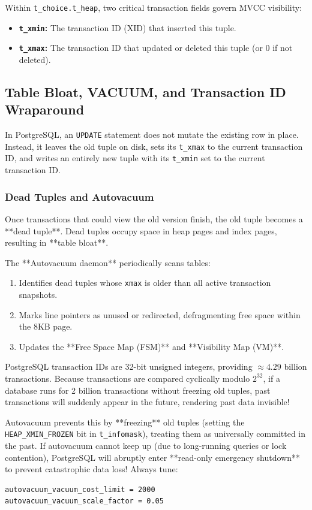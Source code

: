 Within \texttt{t\_choice.t\_heap}, two critical transaction fields govern MVCC visibility:
\begin{itemize}[leftmargin=15pt]
  \item \textbf{\texttt{t\_xmin}:} The transaction ID (XID) that inserted this tuple.
  \item \textbf{\texttt{t\_xmax}:} The transaction ID that updated or deleted this tuple (or 0 if not deleted).
\end{itemize}

\subsection{Table Bloat, VACUUM, and Transaction ID Wraparound}

In PostgreSQL, an \texttt{UPDATE} statement does not mutate the existing row in place. Instead, it leaves the old tuple on disk, sets its \texttt{t\_xmax} to the current transaction ID, and writes an entirely new tuple with its \texttt{t\_xmin} set to the current transaction ID.

\subsubsection{Dead Tuples and Autovacuum}
Once transactions that could view the old version finish, the old tuple becomes a **dead tuple**. Dead tuples occupy space in heap pages and index pages, resulting in **table bloat**.

The **Autovacuum daemon** periodically scans tables:
\begin{enumerate}[leftmargin=15pt]
  \item Identifies dead tuples whose \texttt{xmax} is older than all active transaction snapshots.
  \item Marks line pointers as unused or redirected, defragmenting free space within the 8KB page.
  \item Updates the **Free Space Map (FSM)** and **Visibility Map (VM)**.
\end{enumerate}

\begin{productionwarningbox}
PostgreSQL transaction IDs are 32-bit unsigned integers, providing $\approx 4.29$ billion transactions. Because transactions are compared cyclically modulo $2^{32}$, if a database runs for 2 billion transactions without freezing old tuples, past transactions will suddenly appear in the future, rendering past data invisible!

Autovacuum prevents this by **freezing** old tuples (setting the \texttt{HEAP\_XMIN\_FROZEN} bit in \texttt{t\_infomask}), treating them as universally committed in the past. If autovacuum cannot keep up (due to long-running queries or lock contention), PostgreSQL will abruptly enter **read-only emergency shutdown** to prevent catastrophic data loss! Always tune:
\begin{lstlisting}[language=sh]
autovacuum_vacuum_cost_limit = 2000
autovacuum_vacuum_scale_factor = 0.05
\end{lstlisting}
\end{productionwarningbox}

